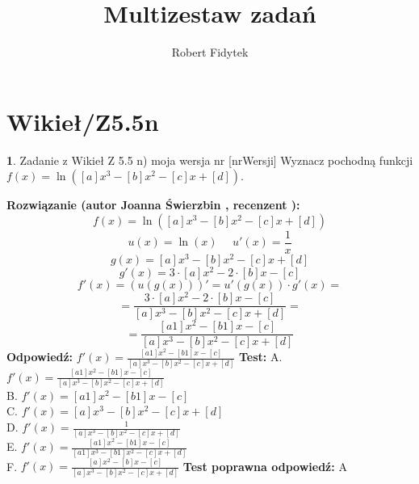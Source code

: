 \documentclass[12pt, a4paper]{article}
\title{Multizestaw zadań}
\author{Robert Fidytek}
\date{}
\theoremstyle{definition} %
\newtheorem{zad}{}
\newcommand{\kategoria}[1]{\section{#1}} %
\newcommand{\zadStart}[1]{\begin{zad}#1\newline} %
\newcommand{\zadStop}{\end{zad}}   %
\newcommand{\rozwStart}[2]{\noindent \textbf{Rozwiązanie (autor #1 , recenzent #2): }\newline} %
\newcommand{\rozwStop}{\newline}                                            %
\newcommand{\odpStart}{\noindent \textbf{Odpowiedź:}\newline}    %
\newcommand{\odpStop}{\newline}                                             %
\newcommand{\testStart}{\noindent \textbf{Test:}\newline} %
\newcommand{\testStop}{\newline} %
\newcommand{\kluczStart}{\noindent \textbf{Test poprawna odpowiedź:}\newline} %
\newcommand{\kluczStop}{\newline} %
\begin{document}
\maketitle


\kategoria{Wikieł/Z5.5n}
\zadStart{Zadanie z Wikieł Z 5.5 n) moja wersja nr [nrWersji]}
Wyznacz pochodną funkcji \\ $f(x)=\ln\left([a]x^3-[b]x^2-[c]x+[d]\right) $.
\zadStop
\rozwStart{Joanna Świerzbin}{}
$$f(x)=\ln{\left([a]x^3-[b]x^2-[c]x+[d]\right)} $$
$$u(x)=\ln{(x)} \ \ \ \ \ \ u'(x)=\frac{1}{x}$$
$$g(x)=[a]x^3-[b]x^2-[c]x+[d] $$ $$ g'(x)=3\cdot[a]x^2-2\cdot[b]x-[c]$$
$$f'(x)=(u(g(x)))'=u'(g(x))\cdot g'(x) = $$
 $$= \frac{3\cdot[a]x^2-2\cdot[b]x-[c]}{[a]x^3-[b]x^2-[c]x+[d]}=$$
$$= \frac{[a1]x^2-[b1]x-[c]}{[a]x^3-[b]x^2-[c]x+[d]}$$
\rozwStop
\odpStart
$ f'(x) = \frac{[a1]x^2-[b1]x-[c]}{[a]x^3-[b]x^2-[c]x+[d]}$
\odpStop
\testStart
A. $ f'(x) = \frac{[a1]x^2-[b1]x-[c]}{[a]x^3-[b]x^2-[c]x+[d]}$\\
B. $ f'(x) = {[a1]x^2-[b1]x-[c]}$ \\
C. $ f'(x) = {[a]x^3-[b]x^2-[c]x+[d]}$ \\
D. $ f'(x) = \frac{1}{[a]x^3-[b]x^2-[c]x+[d]}$\\
E. $ f'(x) = \frac{[a1]x^2-[b1]x-[c]}{[a1]x^3-[b1]x^2-[c]x+[d]}$\\
F. $ f'(x) = \frac{[a]x^2-[b]x-[c]}{[a]x^3-[b]x^2-[c]x+[d]}$
\testStop
\kluczStart
A
\kluczStop
\end{document}
